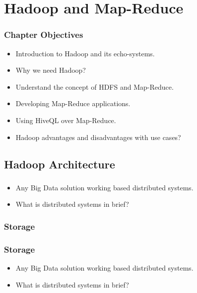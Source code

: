 \section{Hadoop and Map-Reduce}


\begin{frame}
\frametitle{Chapter Objectives}

\begin{itemize}
	\item<1-> Introduction to Hadoop and its echo-systems. \pause
	\item<2-> Why we need Hadoop? \pause
	\item<3-> Understand the concept of HDFS and Map-Reduce.
	\item<4-> Developing Map-Reduce applications. \pause
	\item<5-> Using HiveQL over Map-Reduce. \pause
	\item<6-> Hadoop advantages and disadvantages with use cases? \pause
\end{itemize}

\end{frame}


\subsection{Hadoop Architecture}
\begin{frame}
\frametitle{\subsecname}
\begin{itemize} 
	\item Any Big Data solution working based distributed systems.
	\item What is distributed systems in brief?
\end{itemize}
\end{frame}



\subsubsection{Storage}
\begin{frame}
\frametitle{Storage}
\begin{itemize} 
	\item Any Big Data solution working based distributed systems.
	\item What is distributed systems in brief?
\end{itemize}
\end{frame}

